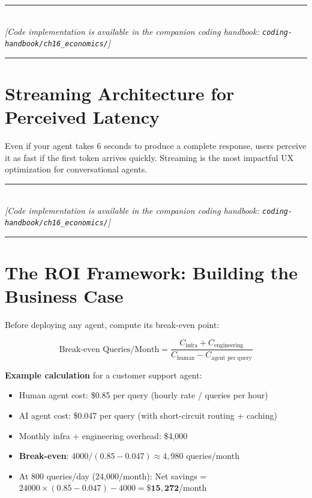 \begin{center}
\noindent\rule{0.6\textwidth}{0.4pt} \\
\vspace{0.3em}
\textit{[Code implementation is available in the companion coding handbook: \texttt{coding-handbook/ch16\_economics/}]} \\
\noindent\rule{0.6\textwidth}{0.4pt}
\end{center}


\section{Streaming Architecture for Perceived Latency}

Even if your agent takes 6 seconds to produce a complete response, users perceive it as fast if the first token arrives quickly. Streaming is the most impactful UX optimization for conversational agents.


\begin{center}
\noindent\rule{0.6\textwidth}{0.4pt} \\
\vspace{0.3em}
\textit{[Code implementation is available in the companion coding handbook: \texttt{coding-handbook/ch16\_economics/}]} \\
\noindent\rule{0.6\textwidth}{0.4pt}
\end{center}


\section{The ROI Framework: Building the Business Case}

Before deploying any agent, compute its break-even point:

\begin{equation}
\text{Break-even Queries/Month} = \frac{C_{\text{infra}} + C_{\text{engineering}}}{C_{\text{human}} - C_{\text{agent per query}}}
\end{equation}

\textbf{Example calculation} for a customer support agent:
\begin{itemize}
    \item Human agent cost: \$0.85 per query (hourly rate / queries per hour)
    \item AI agent cost: \$0.047 per query (with short-circuit routing + caching)
    \item Monthly infra + engineering overhead: \$4,000
    \item \textbf{Break-even}: $4000 / (0.85 - 0.047) \approx 4,980$ queries/month
    \item At 800 queries/day (24,000/month): Net savings = $24000 \times (0.85 - 0.047) - 4000 = \mathbf{\$15,272}$/month
\end{itemize}
